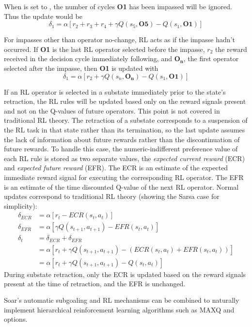 When  is set to , the number of cycles \textbf{O1} has been impassed will be ignored.
Thus the update would be
$$\delta_1 = \alpha \left[ r_2 + r_3 + r_4 + \gamma Q(s_5, \textbf{O5}) - Q(s_1, \textbf{O1}) \right]$$

For impasses other than operator no-change, RL acts as if the impasse hadn't occurred.
If \textbf{O1} is the last RL operator selected before the impasse, $r_2$ the reward received in the decision cycle immediately following, and \textbf{O}$_\textbf{n}$, the first operator selected after the impasse, then \textbf{O1} is updated with 
$$\delta_1 = \alpha \left[ r_2 + \gamma Q(s_n, \textbf{O}_\textbf{n}) - Q(s_1, \textbf{O1}) \right]$$

If an RL operator is selected in a substate immediately prior to the state's retraction, the RL rules will be updated based only on the reward signals present and not on the Q-values of future operators.
This point is not covered in traditional RL theory.
The retraction of a substate corresponds to a suspension of the RL task in that state rather than its termination, so the last update assumes the lack of information about future rewards rather than the discontinuation of future rewards.
To handle this case, the numeric-indifferent preference value of each RL rule is stored as two separate values, the \textit{expected current reward} (ECR) and \textit{expected future reward} (EFR).
The ECR is an estimate of the expected immediate reward signal for executing the corresponding RL operator.
The EFR is an estimate of the time discounted Q-value of the next RL operator.
Normal updates correspond to traditional RL theory (showing the Sarsa case for simplicity):
\begin{align*}
\delta_{ECR} &= \alpha \left[ r_t - ECR(s_t, a_t) \right] \\
\delta_{EFR} &= \alpha \left[ \gamma Q(s_{t+1}, a_{t+1}) - EFR(s_t, a_t) \right] \\
\delta_t &= \delta_{ECR} + \delta_{EFR} \\
&= \alpha \left[ r_t + \gamma Q(s_{t+1}, a_{t+1}) - \left( ECR(s_t, a_t) + EFR(s_t, a_t) \right) \right] \\
&= \alpha \left[ r_t + \gamma Q(s_{t+1}, a_{t+1}) - Q(s_t, a_t) \right]
\end{align*}
During substate retraction, only the ECR is updated based on the reward signals present at the time of retraction, and the EFR is unchanged.

Soar's automatic subgoaling and RL mechanisms can be combined to naturally implement hierarchical reinforcement learning algorithms such as MAXQ and options.

